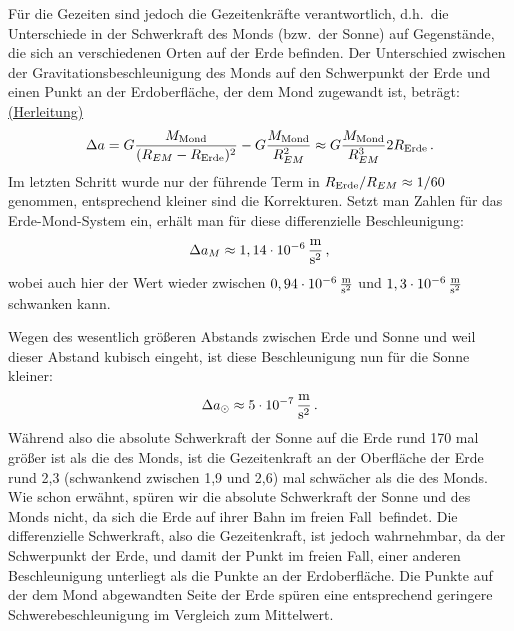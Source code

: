 F\"ur die Gezeiten sind jedoch die Gezeitenkr\"afte verantwortlich, d.h.\ die Unterschiede in
der Schwerkraft des Monds (bzw.\ der Sonne) auf Gegenst\"ande, die sich an
verschiedenen Orten auf der Erde befinden. Der Unterschied zwischen der Gravitationsbeschleunigung des
Monds auf den Schwerpunkt der Erde und einen Punkt an der Erdoberfl\"ache, der dem Mond
zugewandt ist, betr\"agt:\hyperref[secA]{(Herleitung)}
\begin{equation}
\label{eq_Delta_a}
                         \Delta a = G \frac{M_{\rm Mond}}{(R_{EM}-R_{\rm Erde})^2}  - 
                          G \frac{M_{\rm Mond}}{R_{EM}^2}  \approx 
                          G \frac{M_{\rm Mond}}{R_{EM}^3} 2 R_{\rm Erde}    \, .
\end{equation} 
Im letzten Schritt wurde nur der f\"uhrende Term in $R_{\rm Erde}/R_{EM} \approx 1/60$ genommen,
entsprechend kleiner sind die Korrekturen. Setzt man Zahlen f\"ur das Erde-Mond-System ein,
erh\"alt man f\"ur diese differenzielle 
Beschleunigung:
\begin{equation}
        \Delta a_M \approx 1,14 \cdot 10^{-6}\, \frac{\rm m}{\rm s^2} \, ,
\end{equation}     
wobei auch hier der Wert wieder zwischen $0,94 \cdot 10^{-6}\, \frac{\rm m}{\rm s^2}$ und
$1,3\cdot 10^{-6}\, \frac{\rm m}{\rm s^2}$ schwanken kann. 

Wegen des wesentlich gr\"o\ss eren Abstands zwischen Erde und Sonne und weil dieser
Abstand kubisch eingeht, ist diese Beschleunigung nun f\"ur die Sonne kleiner: 
\begin{equation}
        \Delta a_\odot \approx 5\cdot 10^{-7}\, \frac{\rm m}{\rm s^2} \, .
\end{equation}  
W\"ahrend also die absolute Schwerkraft der Sonne auf die Erde rund 170 mal gr\"o\ss er ist als die des Monds,
ist die Gezeitenkraft an der Oberfl\"ache der Erde rund 2,3 (schwankend zwischen 1,9 und 2,6) mal
schw\"acher als die des Monds. Wie schon erw\"ahnt, sp\"uren wir die absolute Schwerkraft der
Sonne und des Monds nicht, da sich die Erde auf ihrer Bahn \glqq im freien Fall\grqq\ befindet. 
Die differenzielle Schwerkraft, also die Gezeitenkraft, ist jedoch wahrnehmbar,
da der Schwerpunkt der Erde, und damit der Punkt im freien Fall, einer anderen Beschleunigung
unterliegt als die Punkte an der Erdoberfl\"ache. Die Punkte auf der dem Mond abgewandten    
Seite der Erde sp\"uren eine entsprechend geringere Schwerebeschleunigung im Vergleich zum
Mittelwert. 

